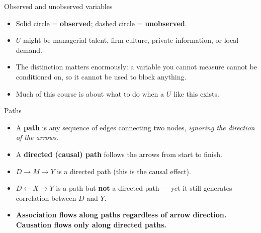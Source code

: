\documentclass[
  11pt,
  ignorenonframetext,
  aspectratio=169,
]{beamer}
\providecommand{\tightlist}{%
  \setlength{\itemsep}{0pt}\setlength{\parskip}{0pt}}
\begin{document}
\begin{frame}{Observed and unobserved variables}
\protect{}\label{observed-and-unobserved-variables}
\begin{itemize}
\tightlist
\item
  Solid circle = \textbf{observed}; dashed circle = \textbf{unobserved}.
\end{itemize}

\begin{center}
\end{center}

\begin{itemize}
\tightlist
\item
  \(U\) might be managerial talent, firm culture, private information,
  or local demand.
\item
  The distinction matters enormously: a variable you cannot measure
  cannot be conditioned on, so it cannot be used to block anything.
\item
  Much of this course is about what to do when a \(U\) like this exists.
\end{itemize}
\end{frame}

\begin{frame}{Paths}
\protect{}\label{paths}
\begin{itemize}
\tightlist
\item
  A \textbf{path} is any sequence of edges connecting two nodes,
  \emph{ignoring the direction of the arrows}.
\item
  A \textbf{directed (causal) path} follows the arrows from start to
  finish.
\end{itemize}

\begin{center}
\end{center}

\begin{itemize}
\tightlist
\item
  \(D \to M \to Y\) is a directed path (this is the causal effect).
\item
  \(D \leftarrow X \to Y\) is a path but \textbf{not} a directed path
  --- yet it still generates correlation between \(D\) and \(Y\).
\item
  \textbf{Association flows along paths regardless of arrow direction.
  Causation flows only along directed paths.}
\end{itemize}
\end{frame}
\end{document}

